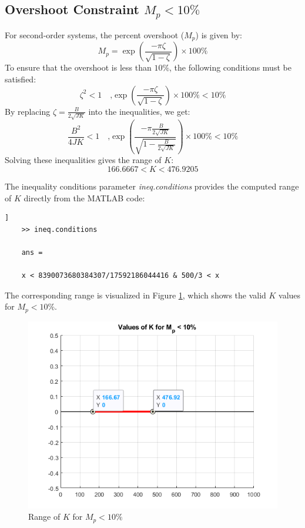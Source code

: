 \documentclass[a4paper, 12pt, english]{article}
\begin{document}
\subsection{Overshoot Constraint {$ {{M}_{p}} < {10\%} $}} \label{sec:overshoot constraint}

\noindent
For second-order systems, the percent overshoot ($ {M}_{p} $) is given by:
\[ {{M}_{p}} = \exp{\left( \frac{-{\pi}{\zeta}}{\sqrt{{1}-{\zeta}}} \right)} \times 100\% \]
To ensure that the overshoot is less than $ {10\%} $, the following conditions must be satisfied:
\[ {{\zeta}^{2}} < {1} \quad\mbox{,} \exp{\left( \frac{-{\pi}{\zeta}}{\sqrt{{1}-{\zeta}}} \right)} \times 100\% < 10\% \]
By replacing $ {\zeta} = {\frac{B}{{2}{\sqrt{{J}{K}}}}} $ into the inequalities, we get:
\[ {\frac{{B}^{2}}{{4}{J}{K}}} < {1} \quad\mbox{,} \exp{\left( \frac{-{\pi}{\frac{B}{{2}{\sqrt{{J}{K}}}}}}{\sqrt{{1}-{{\frac{B}{{2}{\sqrt{{J}{K}}}}}}}} \right)} \times 100\% < 10\% \]
Solving these inequalities gives the range of $K$:
\[ {166.6667} < {K} < {476.9205} \]



\noindent
The inequality conditions parameter \textit{ineq.conditions} provides the computed range of $K$ directly from the MATLAB code:

\begin{lstlisting}[style=commandstyle,caption=Command line output]]
    >> ineq.conditions
 
    ans =
     
    x < 8390073680384307/17592186044416 & 500/3 < x
\end{lstlisting}

\noindent
The corresponding range is visualized in Figure \ref{fig:Overshoot constraint}, which shows the valid $K$ values for $ {{M}_{p}} < {10\%} $.

\begin{figure}[H]
    \centering
    \includegraphics[width=0.8\linewidth]{report/images/KforMp10.png}
    \caption{Range of $K$ for $ {{M}_{p}} < {10\%} $}
    \label{fig:Overshoot constraint}
\end{figure}
\end{document}
